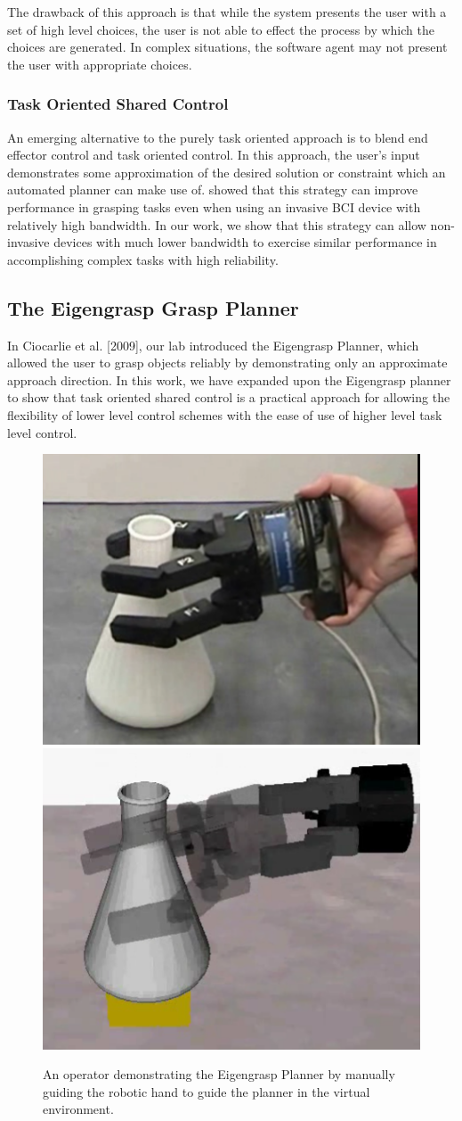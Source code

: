 The drawback of this approach is that while the system presents the user with a set of high level choices, the user is not able to effect the process by which the choices are generated. In complex situations, the software agent may not present the user with appropriate choices. 

\subsubsection{Task Oriented Shared Control}
An emerging alternative to the purely task oriented approach is to blend end effector control and task oriented control. In this approach, the user's input demonstrates some approximation of the desired solution or constraint which an automated planner can make use of. \cite{Mulling2015} showed that this strategy can improve performance in grasping tasks even when using an invasive BCI device with relatively high bandwidth. In our work, we show that this strategy can allow non-invasive devices with much lower bandwidth to exercise similar performance in accomplishing complex tasks with high reliability. 

\subsection{The Eigengrasp Grasp Planner}
 In Ciocarlie et al. [2009], our lab introduced the Eigengrasp Planner, which allowed the user to grasp objects reliably by demonstrating only an approximate approach direction. In this work, we have expanded upon the Eigengrasp planner to show that task oriented shared control is a practical approach for allowing the flexibility of lower level control schemes with the ease of use of higher level task level control. 

\begin{figure}[b]
	\includegraphics[width=.49\textwidth]{images_2/real_eg_grasp.png}
	\includegraphics[width=.49\textwidth]{images_2/simulated_eg_grasp2.png}
	\caption{An operator demonstrating the Eigengrasp Planner by manually guiding the robotic hand to guide the planner in the virtual environment.\cite{CiocarlieIJRR}}
	\label{fig:egplanner_demo} 
\end{figure}

